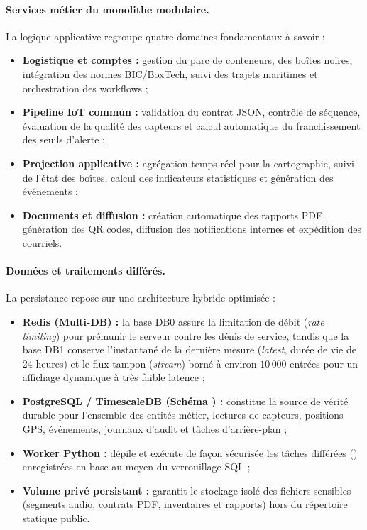 \paragraph{Services métier du monolithe modulaire.}
La logique applicative regroupe quatre domaines fondamentaux à savoir :
\begin{itemize}
    \item \textbf{Logistique et comptes :} gestion du parc de conteneurs, des boîtes noires, intégration des normes BIC/BoxTech, suivi des trajets maritimes et orchestration des workflows ;
    \item \textbf{Pipeline IoT commun :} validation du contrat JSON, contrôle de séquence, évaluation de la qualité des capteurs et calcul automatique du franchissement des seuils d'alerte ;
    \item \textbf{Projection applicative :} agrégation temps réel pour la cartographie, suivi de l'état des boîtes, calcul des indicateurs statistiques et génération des événements ;
    \item \textbf{Documents et diffusion :} création automatique des rapports PDF, génération des QR codes, diffusion des notifications internes et expédition des courriels.
\end{itemize}

\paragraph{Données et traitements différés.}
La persistance repose sur une architecture hybride optimisée :
\begin{itemize}
    \item \textbf{Redis (Multi-DB) :} la base DB0 assure la limitation de débit (\emph{rate limiting}) pour prémunir le serveur contre les dénis de service, tandis que la base DB1 conserve l'instantané de la dernière mesure (\emph{latest}, durée de vie de 24 heures) et le flux tampon (\emph{stream}) borné à environ $10\,000$ entrées pour un affichage dynamique à très faible latence ;
    \item \textbf{PostgreSQL / TimescaleDB (Schéma ) :} constitue la source de vérité durable pour l'ensemble des entités métier, lectures de capteurs, positions GPS, événements, journaux d'audit et tâches d'arrière-plan ;
    \item \textbf{Worker Python :} dépile et exécute de façon sécurisée les tâches différées () enregistrées en base au moyen du verrouillage SQL  ;
    \item \textbf{Volume privé persistant :} garantit le stockage isolé des fichiers sensibles (segments audio, contrats PDF, inventaires et rapports) hors du répertoire statique public.
\end{itemize}

